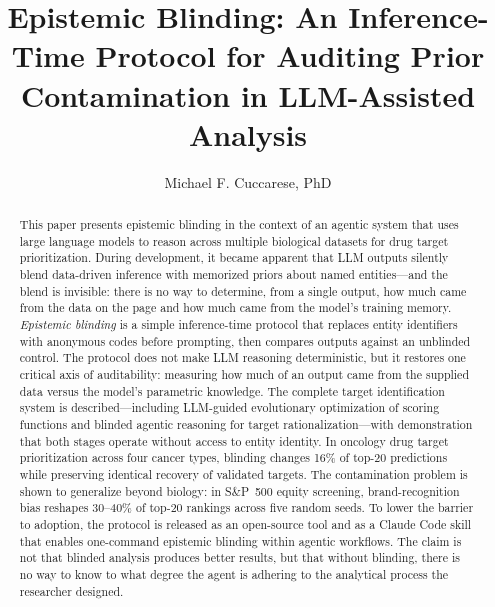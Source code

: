 \documentclass[sigconf, nonacm]{acmart}
\begin{document}
\title{Epistemic Blinding: An Inference-Time Protocol for Auditing Prior Contamination in LLM-Assisted Analysis}

\author{Michael F. Cuccarese, PhD}
\affiliation{%
  \country{}}
\email{}

\begin{abstract}
This paper presents epistemic blinding in the context of an agentic system that uses large language models to reason across multiple biological datasets for drug target prioritization. During development, it became apparent that LLM outputs silently blend data-driven inference with memorized priors about named entities---and the blend is invisible: there is no way to determine, from a single output, how much came from the data on the page and how much came from the model's training memory. \textit{Epistemic blinding} is a simple inference-time protocol that replaces entity identifiers with anonymous codes before prompting, then compares outputs against an unblinded control. The protocol does not make LLM reasoning deterministic, but it restores one critical axis of auditability: measuring how much of an output came from the supplied data versus the model's parametric knowledge. The complete target identification system is described---including LLM-guided evolutionary optimization of scoring functions and blinded agentic reasoning for target rationalization---with demonstration that both stages operate without access to entity identity. In oncology drug target prioritization across four cancer types, blinding changes 16\% of top-20 predictions while preserving identical recovery of validated targets. The contamination problem is shown to generalize beyond biology: in S\&P~500 equity screening, brand-recognition bias reshapes 30--40\% of top-20 rankings across five random seeds. To lower the barrier to adoption, the protocol is released as an open-source tool and as a Claude Code skill that enables one-command epistemic blinding within agentic workflows. The claim is not that blinded analysis produces better results, but that without blinding, there is no way to know to what degree the agent is adhering to the analytical process the researcher designed.
\end{abstract}

\maketitle

\end{document}
